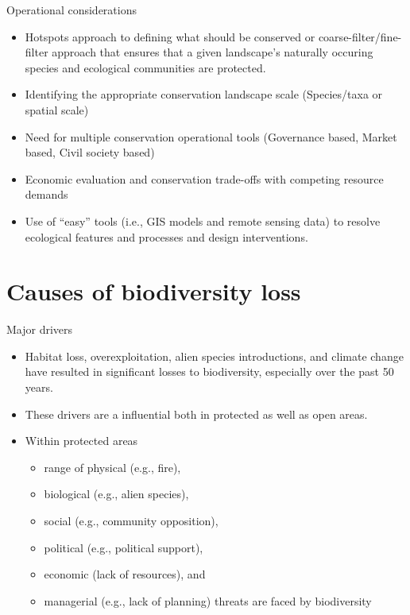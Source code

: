 \documentclass[ignorenonframetext,aspectratio=169]{beamer}
\providecommand{\tightlist}{%
  \setlength{\itemsep}{0pt}\setlength{\parskip}{0pt}}
\begin{document}
\begin{frame}{Operational considerations}
\protect\hypertarget{operational-considerations}{}

\begin{itemize}
\tightlist
\item
  Hotspots approach to defining what should be conserved or
  coarse-filter/fine-filter approach that ensures that a given
  landscape's naturally occuring species and ecological communities are
  protected.
\item
  Identifying the appropriate conservation landscape scale (Species/taxa
  or spatial scale)
\item
  Need for multiple conservation operational tools (Governance based,
  Market based, Civil society based)
\item
  Economic evaluation and conservation trade-offs with competing
  resource demands
\item
  Use of ``easy'' tools (i.e., GIS models and remote sensing data) to
  resolve ecological features and processes and design interventions.
\end{itemize}

\end{frame}

\hypertarget{causes-of-biodiversity-loss}{%
\section{Causes of biodiversity
loss}\label{causes-of-biodiversity-loss}}

\begin{frame}{Major drivers}
\protect\hypertarget{major-drivers}{}

\begin{itemize}
\tightlist
\item
  Habitat loss, overexploitation, alien species introductions, and
  climate change have resulted in significant losses to biodiversity,
  especially over the past 50 years.
\item
  These drivers are a influential both in protected as well as open
  areas.
\item
  Within protected areas

  \begin{itemize}
  \tightlist
  \item
    range of physical (e.g., fire),
  \item
    biological (e.g., alien species),
  \item
    social (e.g., community opposition),
  \item
    political (e.g., political support),
  \item
    economic (lack of resources), and
  \item
    managerial (e.g., lack of planning) threats are faced by
    biodiversity
  \end{itemize}
\end{itemize}

\end{frame}
\end{document}

